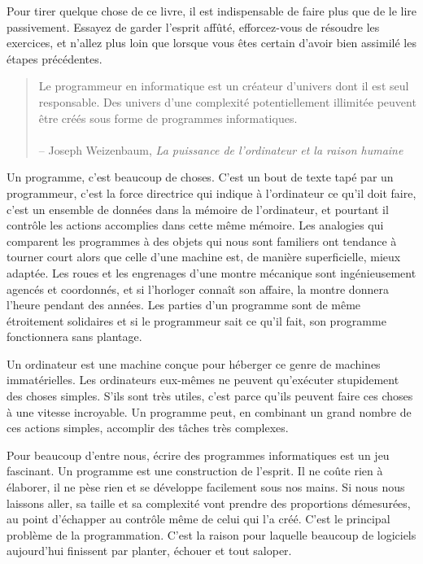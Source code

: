 \documentclass{FramateX}
\begin{document}
Pour tirer quelque chose de ce livre, il est indispensable de faire plus
que de le lire passivement. Essayez de garder l'esprit affûté,
efforcez-vous de résoudre les exercices, et n'allez plus loin que
lorsque vous êtes certain d'avoir bien assimilé les étapes précédentes.

\begin{center}\end{center}

\begin{quote}
Le programmeur en informatique est un créateur d'univers dont il est
seul responsable. Des univers d'une complexité potentiellement illimitée
peuvent être créés sous forme de programmes informatiques.\\\\-- Joseph
Weizenbaum, \emph{La puissance de l'ordinateur et la raison humaine}
\end{quote}
Un programme, c'est beaucoup de choses. C'est un bout de texte tapé par
un programmeur, c'est la force directrice qui indique à l'ordinateur ce
qu'il doit faire, c'est un ensemble de données dans la mémoire de
l'ordinateur, et pourtant il contrôle les actions accomplies dans cette
même mémoire. Les analogies qui comparent les programmes à des objets
qui nous sont familiers ont tendance à tourner court alors que celle
d'une machine est, de manière superficielle, mieux adaptée. Les roues et
les engrenages d'une montre mécanique sont ingénieusement agencés et
coordonnés, et si l'horloger connaît son affaire, la montre donnera
l'heure pendant des années. Les parties d'un programme sont de même
étroitement solidaires et si le programmeur sait ce qu'il fait, son
programme fonctionnera sans plantage.

Un ordinateur est une machine conçue pour héberger ce genre de machines
immatérielles. Les ordinateurs eux-mêmes ne peuvent qu'exécuter
stupidement des choses simples. S'ils sont très utiles, c'est parce
qu'ils peuvent faire ces choses à une vitesse incroyable. Un programme
peut, en combinant un grand nombre de ces actions simples, accomplir des
tâches très complexes.

Pour beaucoup d'entre nous, écrire des programmes informatiques est un
jeu fascinant. Un programme est une construction de l'esprit. Il ne
coûte rien à élaborer, il ne pèse rien et se développe facilement sous
nos mains. Si nous nous laissons aller, sa taille et sa complexité vont
prendre des proportions démesurées, au point d'échapper au contrôle même
de celui qui l'a créé. C'est le principal problème de la programmation.
C'est la raison pour laquelle beaucoup de logiciels aujourd'hui
finissent par planter, échouer et tout saloper.
\end{document}
